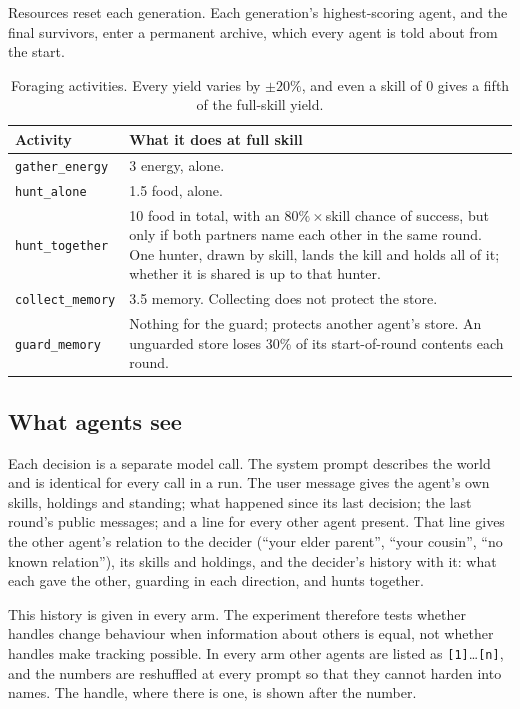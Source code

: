 \documentclass[11pt]{article}
\newcommand{\arm}[1]{\texttt{#1}}
\begin{document}
Resources reset each generation. Each generation's highest-scoring agent, and the final
survivors, enter a permanent archive, which every agent is told about from the start.

\begin{table}[t]
\centering
\caption{Foraging activities. Every yield varies by $\pm20\%$, and even a skill of 0 gives a fifth
of the full-skill yield.}
\label{tab:activities}
\begin{tabularx}{\linewidth}{@{}lX@{}}
\toprule
Activity & What it does at full skill \\
\midrule
\arm{gather\_energy} & 3 energy, alone. \\
\arm{hunt\_alone} & 1.5 food, alone. \\
\arm{hunt\_together} & 10 food in total, with an $80\%\times$skill chance of success, but only if
both partners name each other in the same round. One hunter, drawn by skill, lands the kill and
holds all of it; whether it is shared is up to that hunter. \\
\arm{collect\_memory} & 3.5 memory. Collecting does not protect the store. \\
\arm{guard\_memory} & Nothing for the guard; protects another agent's store. An unguarded store
loses 30\% of its start-of-round contents each round. \\
\bottomrule
\end{tabularx}
\end{table}

\subsection{What agents see}

Each decision is a separate model call. The system prompt describes the world and is identical
for every call in a run. The user message gives the agent's own skills, holdings and standing;
what happened since its last decision; the last round's public messages; and a line for every
other agent present. That line gives the other agent's relation to the decider (``your elder
parent'', ``your cousin'', ``no known relation''), its skills and holdings, and the decider's
history with it: what each gave the other, guarding in each direction, and hunts together.

This history is given in every arm. The experiment therefore tests whether handles change
behaviour when information about others is equal, not whether handles make tracking possible.
In every arm other agents are listed as \texttt{[1]}\ldots\texttt{[n]}, and the numbers are
reshuffled at every prompt so that they cannot harden into names. The handle, where there is
one, is shown after the number.
\end{document}
